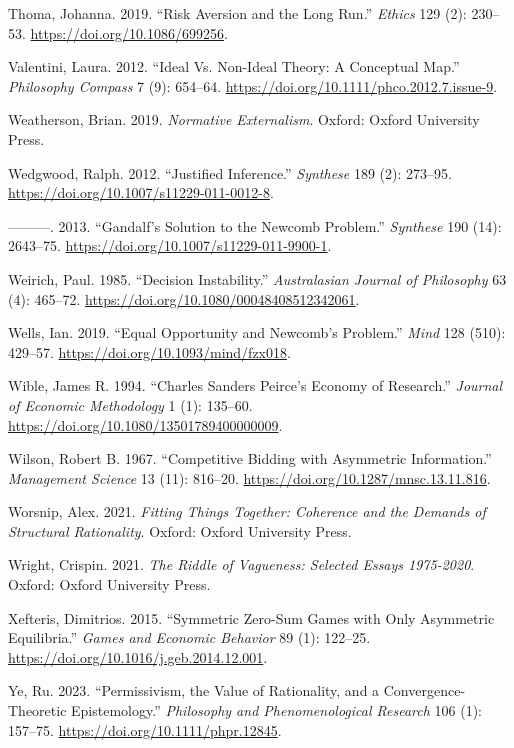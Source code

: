 \documentclass[
  12pt,
  letterpaper,
  DIV=11,
  numbers=noendperiod]{scrreprt}
\newlength{\cslhangindent}
\newenvironment{CSLReferences}[2] %
 {\begin{list}{}{%
  \setlength{\itemindent}{0pt}
  \setlength{\leftmargin}{0pt}
  \setlength{\parsep}{0pt}
  \ifodd #1
   \setlength{\leftmargin}{\cslhangindent}
   \setlength{\itemindent}{-1\cslhangindent}
  \fi
  \setlength{\itemsep}{#2\baselineskip}}}
 {\end{list}}
\begin{document}
\begin{CSLReferences}{1}{0}
Thoma, Johanna. 2019. {``Risk Aversion and the Long Run.''}
\emph{Ethics} 129 (2): 230--53. \url{https://doi.org/10.1086/699256}.

Valentini, Laura. 2012. {``Ideal Vs. Non-Ideal Theory: A Conceptual
Map.''} \emph{Philosophy Compass} 7 (9): 654--64.
\url{https://doi.org/10.1111/phco.2012.7.issue-9}.

Weatherson, Brian. 2019. \emph{Normative Externalism}. Oxford: Oxford
University Press.

Wedgwood, Ralph. 2012. {``Justified Inference.''} \emph{Synthese} 189
(2): 273--95. \url{https://doi.org/10.1007/s11229-011-0012-8}.

---------. 2013. {``Gandalf's Solution to the Newcomb Problem.''}
\emph{Synthese} 190 (14): 2643--75.
\url{https://doi.org/10.1007/s11229-011-9900-1}.

Weirich, Paul. 1985. {``Decision Instability.''} \emph{Australasian
Journal of Philosophy} 63 (4): 465--72.
\url{https://doi.org/10.1080/00048408512342061}.

Wells, Ian. 2019. {``Equal Opportunity and Newcomb's Problem.''}
\emph{Mind} 128 (510): 429--57.
\url{https://doi.org/10.1093/mind/fzx018}.

Wible, James R. 1994. {``Charles Sanders Peirce's Economy of
Research.''} \emph{Journal of Economic Methodology} 1 (1): 135--60.
\url{https://doi.org/10.1080/13501789400000009}.

Wilson, Robert B. 1967. {``Competitive Bidding with Asymmetric
Information.''} \emph{Management Science} 13 (11): 816--20.
\url{https://doi.org/10.1287/mnsc.13.11.816}.

Worsnip, Alex. 2021. \emph{Fitting Things Together: Coherence and the
Demands of Structural Rationality}. Oxford: Oxford University Press.

Wright, Crispin. 2021. \emph{The Riddle of Vagueness: Selected Essays
1975-2020}. Oxford: Oxford University Press.

Xefteris, Dimitrios. 2015. {``Symmetric Zero-Sum Games with Only
Asymmetric Equilibria.''} \emph{Games and Economic Behavior} 89 (1):
122--25. \url{https://doi.org/10.1016/j.geb.2014.12.001}.

Ye, Ru. 2023. {``Permissivism, the Value of Rationality, and a
Convergence-Theoretic Epistemology.''} \emph{Philosophy and
Phenomenological Research} 106 (1): 157--75.
\url{https://doi.org/10.1111/phpr.12845}.

\end{CSLReferences}
\end{document}
